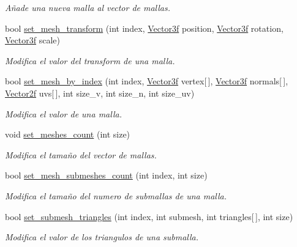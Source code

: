 \begin{DoxyCompactItemize}
\begin{DoxyCompactList}\small\item\em Añade una nueva malla al vector de mallas. \end{DoxyCompactList}\item 
bool \mbox{\hyperlink{class_exporter_ab4fd707721e3b7dab9e628659826ba91}{set\+\_\+mesh\+\_\+transform}} (int index, \mbox{\hyperlink{structmathexp_1_1_vector3f}{Vector3f}} position, \mbox{\hyperlink{structmathexp_1_1_vector3f}{Vector3f}} rotation, \mbox{\hyperlink{structmathexp_1_1_vector3f}{Vector3f}} scale)
\begin{DoxyCompactList}\small\item\em Modifica el valor del transform de una malla. \end{DoxyCompactList}\item 
bool \mbox{\hyperlink{class_exporter_aefd37f252280f8c4aa8942aad3295bf2}{set\+\_\+mesh\+\_\+by\+\_\+index}} (int index, \mbox{\hyperlink{structmathexp_1_1_vector3f}{Vector3f}} vertex\mbox{[}$\,$\mbox{]}, \mbox{\hyperlink{structmathexp_1_1_vector3f}{Vector3f}} normals\mbox{[}$\,$\mbox{]}, \mbox{\hyperlink{structmathexp_1_1_vector2f}{Vector2f}} uvs\mbox{[}$\,$\mbox{]}, int size\+\_\+v, int size\+\_\+n, int size\+\_\+uv)
\begin{DoxyCompactList}\small\item\em Modifica el valor de una malla. \end{DoxyCompactList}\item 
void \mbox{\hyperlink{class_exporter_a8a53ffeabad803db16f0cafffd38793f}{set\+\_\+meshes\+\_\+count}} (int size)
\begin{DoxyCompactList}\small\item\em Modifica el tamaño del vector de mallas. \end{DoxyCompactList}\item 
bool \mbox{\hyperlink{class_exporter_a65ae525fd7dcfeec22910ad3dc5cd461}{set\+\_\+mesh\+\_\+submeshes\+\_\+count}} (int index, int size)
\begin{DoxyCompactList}\small\item\em Modifica el tamaño del numero de submallas de una malla. \end{DoxyCompactList}\item 
bool \mbox{\hyperlink{class_exporter_ad51828efe27f5445df5dfc178afe4d6c}{set\+\_\+submesh\+\_\+triangles}} (int index, int submesh, int triangles\mbox{[}$\,$\mbox{]}, int size)
\begin{DoxyCompactList}\small\item\em Modifica el valor de los triangulos de una submalla. \end{DoxyCompactList}\item 

\end{DoxyCompactItemize}
